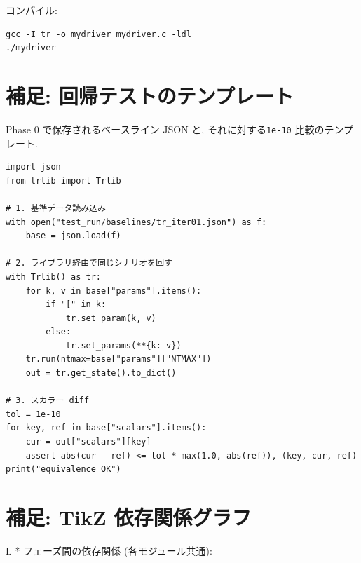\documentclass[11pt,a4paper]{report}
\begin{document}
コンパイル:

\begin{lstlisting}[style=bash]
gcc -I tr -o mydriver mydriver.c -ldl
./mydriver
\end{lstlisting}

\chapter{補足: 回帰テストのテンプレート}

Phase 0 で保存されるベースライン JSON と, それに対する\texttt{1e-10}
比較のテンプレート.

\begin{lstlisting}[style=py]
import json
from trlib import Trlib

# 1. 基準データ読み込み
with open("test_run/baselines/tr_iter01.json") as f:
    base = json.load(f)

# 2. ライブラリ経由で同じシナリオを回す
with Trlib() as tr:
    for k, v in base["params"].items():
        if "[" in k:
            tr.set_param(k, v)
        else:
            tr.set_params(**{k: v})
    tr.run(ntmax=base["params"]["NTMAX"])
    out = tr.get_state().to_dict()

# 3. スカラー diff
tol = 1e-10
for key, ref in base["scalars"].items():
    cur = out["scalars"][key]
    assert abs(cur - ref) <= tol * max(1.0, abs(ref)), (key, cur, ref)
print("equivalence OK")
\end{lstlisting}

\chapter{補足: TikZ 依存関係グラフ}

L-* フェーズ間の依存関係 (各モジュール共通):

\begin{center}
\end{center}
\end{document}
